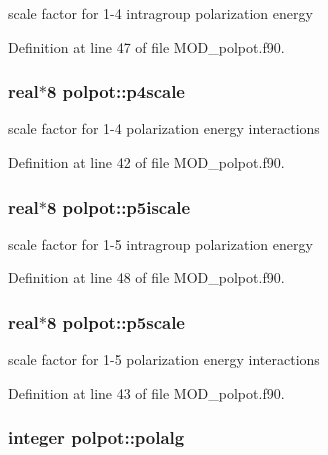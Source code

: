scale factor for 1-\/4 intragroup polarization energy 



Definition at line 47 of file M\-O\-D\-\_\-polpot.\-f90.

\hypertarget{classpolpot_a88cbeff943a0696443b4d2da069b65cc}{
\subsubsection[{p4scale}]{\setlength{\rightskip}{0pt plus 5cm}real$\ast$8 polpot\-::p4scale}}\label{classpolpot_a88cbeff943a0696443b4d2da069b65cc}


scale factor for 1-\/4 polarization energy interactions 



Definition at line 42 of file M\-O\-D\-\_\-polpot.\-f90.

\hypertarget{classpolpot_ac2002e97127817d06b0dad560e78be87}{
\subsubsection[{p5iscale}]{\setlength{\rightskip}{0pt plus 5cm}real$\ast$8 polpot\-::p5iscale}}\label{classpolpot_ac2002e97127817d06b0dad560e78be87}


scale factor for 1-\/5 intragroup polarization energy 



Definition at line 48 of file M\-O\-D\-\_\-polpot.\-f90.

\hypertarget{classpolpot_a9e34898b348ec7377b3e659b00cfbd36}{
\subsubsection[{p5scale}]{\setlength{\rightskip}{0pt plus 5cm}real$\ast$8 polpot\-::p5scale}}\label{classpolpot_a9e34898b348ec7377b3e659b00cfbd36}


scale factor for 1-\/5 polarization energy interactions 



Definition at line 43 of file M\-O\-D\-\_\-polpot.\-f90.

\hypertarget{classpolpot_a89d0f4d40cd0dbced9858fee7c3ad13b}{
\subsubsection[{polalg}]{\setlength{\rightskip}{0pt plus 5cm}integer polpot\-::polalg}}\label{classpolpot_a89d0f4d40cd0dbced9858fee7c3ad13b}


